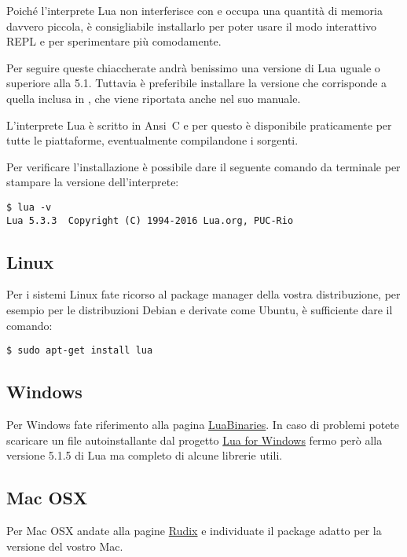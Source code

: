 Poiché l'interprete Lua non interferisce con \LuaTeX{} e occupa una quantità di
memoria davvero piccola, è consigliabile installarlo per poter usare il modo
interattivo REPL e per sperimentare più comodamente.

Per seguire queste chiaccherate andrà benissimo una versione di Lua uguale o
superiore alla 5.1. Tuttavia è preferibile installare la versione che
corrisponde a quella inclusa in \LuaTeX{}, che viene riportata anche nel suo
manuale.

L'interprete Lua è scritto in Ansi~C e per questo è disponibile praticamente
per tutte le piattaforme, eventualmente compilandone i sorgenti.

Per verificare l'installazione è possibile dare il seguente comando da
terminale per stampare la versione dell'interprete:
\begin{Verbatim}
$ lua -v
Lua 5.3.3  Copyright (C) 1994-2016 Lua.org, PUC-Rio
\end{Verbatim}



\subsection{Linux}

Per i sistemi Linux fate ricorso al package manager della vostra distribuzione,
per esempio per le distribuzioni Debian e derivate come Ubuntu, è sufficiente
dare il comando:
\begin{Verbatim}
$ sudo apt-get install lua
\end{Verbatim}



\subsection{Windows}

Per Windows fate riferimento alla pagina
\href{http://luabinaries.sourceforge.net/index.html}{LuaBinaries}. In caso di
problemi potete scaricare un file autoinstallante dal progetto
\href{https://github.com/rjpcomputing/luaforwindows}{Lua for Windows} fermo
però alla versione 5.1.5 di Lua ma completo di alcune librerie utili.



\subsection{Mac OSX}

Per Mac OSX andate alla pagine \href{http://rudix.org/packages/lua.html}{Rudix}
e individuate il package adatto per la versione del vostro Mac.



